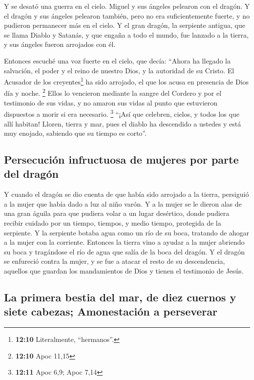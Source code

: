  Y se desató una guerra en el cielo. Miguel y sus ángeles
pelearon con el dragón. Y el dragón y sus ángeles pelearon también,
 pero no era suficientemente fuerte, y no pudieron
permanecer más en el cielo.  Y el gran dragón, la
serpiente antigua, que se llama Diablo y Satanás, y que engaña a todo el
mundo, fue lanzado a la tierra, y sus ángeles fueron arrojados con él.

 Entonces escuché una voz fuerte en el cielo, que decía:
``Ahora ha llegado la salvación, el poder y el reino de nuestro Dios, y
la autoridad de su Cristo. El Acusador de los creyentes\footnote{\textbf{12:10}
  Literalmente, ``hermanos''.} ha sido arrojado, el que los acusa en
presencia de Dios día y noche. \footnote{\textbf{12:10} Apoc 11,15}
 Ellos lo vencieron mediante la sangre del Cordero y por
el testimonio de sus vidas, y no amaron sus vidas al punto que
estuvieron dispuestos a morir si era necesario. \footnote{\textbf{12:11}
  Apoc 6,9; Apoc 7,14}  ``¡Así que celebren, cielos, y
todos los que allí habitan! Lloren, tierra y mar, pues el diablo ha
descendido a ustedes y está muy enojado, sabiendo que su tiempo es
corto''.

\hypertarget{persecuciuxf3n-infructuosa-de-mujeres-por-parte-del-draguxf3n}{%
\subsection{Persecución infructuosa de mujeres por parte del
dragón}\label{persecuciuxf3n-infructuosa-de-mujeres-por-parte-del-draguxf3n}}

 Y cuando el dragón se dio cuenta de que había sido
arrojado a la tierra, persiguió a la mujer que había dado a luz al niño
varón.  Y a la mujer se le dieron alas de una gran águila
para que pudiera volar a un lugar desértico, donde pudiera recibir
cuidado por un tiempo, tiempos, y medio tiempo, protegida de la
serpiente.  Y la serpiente botaba agua como un río de su
boca, tratando de ahogar a la mujer con la corriente. 
Entonces la tierra vino a ayudar a la mujer abriendo su boca y
tragándose el río de agua que salía de la boca del dragón.
 Y el dragón se enfureció contra la mujer, y se fue a
atacar el resto de su descendencia, aquellos que guardan los
mandamientos de Dios y tienen el testimonio de Jesús.

\hypertarget{la-primera-bestia-del-mar-de-diez-cuernos-y-siete-cabezas-amonestaciuxf3n-a-perseverar}{%
\subsection{La primera bestia del mar, de diez cuernos y siete cabezas;
Amonestación a
perseverar}\label{la-primera-bestia-del-mar-de-diez-cuernos-y-siete-cabezas-amonestaciuxf3n-a-perseverar}}

